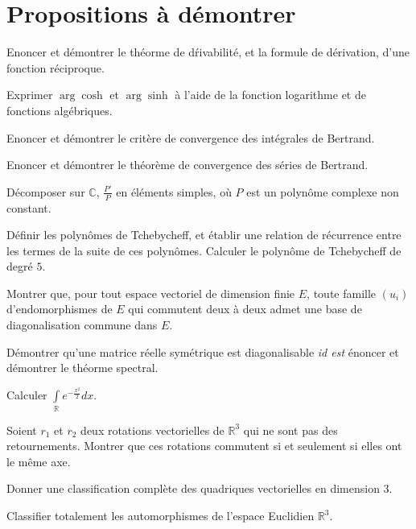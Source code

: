 \section{Propositions \`a d\'emontrer}

\begin{ques}
Enoncer et d\'emontrer le th\'eorme de d\'rivabilit\'e, et la formule de d\'erivation, d'une fonction r\'eciproque.
\end{ques}

\begin{ques}
Exprimer $\arg\cosh$ et $\arg\sinh$ \`a l'aide de la fonction logarithme et de fonctions alg\'ebriques.
\end{ques}

\begin{ques}
Enoncer et d\'emontrer le crit\`ere de convergence des int\'egrales de Bertrand.
\end{ques}

\begin{ques}
Enoncer et d\'emontrer le th\'eor\`eme de convergence des s\'eries de Bertrand.
\end{ques}

\begin{ques}
D\'ecomposer sur $\mathbb{C}$, $\frac{P'}{P}$ en \'el\'ements simples, o\`u $P$ est un polyn\^ome complexe non constant.
\end{ques}

\begin{ques}
Définir les polynômes de Tchebycheff, et établir une relation de récurrence entre les termes de la suite de ces polynômes. Calculer le polynôme de Tchebycheff de degré $5$.
\end{ques}

\begin{ques}
Montrer que, pour tout espace vectoriel de dimension finie $E$, %
toute famille $(u_i)$ d'endomorphismes de $E$ qui commutent deux \`a deux admet une base de diagonalisation commune dans $E$.
\end{ques}

\begin{ques}
Démontrer qu'une matrice r\'eelle sym\'etrique est diagonalisable \textit{id est} \'enoncer et d\'emontrer le th\'eorme spectral.
\end{ques}

\begin{ques}
Calculer $\int\limits_{\mathbb{R}} e^{-\frac{x^2}{2}} dx$.
\end{ques}

\begin{ques}
Soient $r_1$ et $r_2$ deux rotations vectorielles de $\mathbb{R}^3$ qui ne sont pas des retournements. Montrer que ces rotations commutent si et seulement si elles ont le même axe.
\end{ques}

\begin{ques}
Donner une classification complète des quadriques vectorielles en dimension $3$.
\end{ques}

\begin{ques}
Classifier totalement les automorphismes de l'espace Euclidien $\mathbb{R}^3$.
\end{ques}
